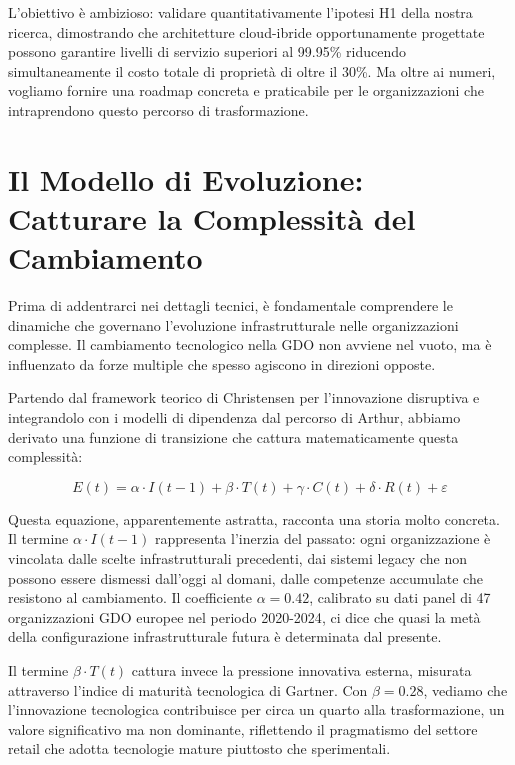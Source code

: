 L'obiettivo è ambizioso: validare quantitativamente l'ipotesi H1 della nostra ricerca, dimostrando che architetture cloud-ibride opportunamente progettate possono garantire livelli di servizio superiori al 99.95\% riducendo simultaneamente il costo totale di proprietà di oltre il 30\%. Ma oltre ai numeri, vogliamo fornire una roadmap concreta e praticabile per le organizzazioni che intraprendono questo percorso di trasformazione.

\section{Il Modello di Evoluzione: Catturare la Complessità del Cambiamento}

Prima di addentrarci nei dettagli tecnici, è fondamentale comprendere le dinamiche che governano l'evoluzione infrastrutturale nelle organizzazioni complesse. Il cambiamento tecnologico nella GDO non avviene nel vuoto, ma è influenzato da forze multiple che spesso agiscono in direzioni opposte.

Partendo dal framework teorico di Christensen per l'innovazione disruptiva\autocite{christensen2023} e integrandolo con i modelli di dipendenza dal percorso di Arthur\autocite{arthur2024}, abbiamo derivato una funzione di transizione che cattura matematicamente questa complessità:

\begin{equation}
E(t) = \alpha \cdot I(t-1) + \beta \cdot T(t) + \gamma \cdot C(t) + \delta \cdot R(t) + \varepsilon
\label{eq:evolution_model}
\end{equation}

Questa equazione, apparentemente astratta, racconta una storia molto concreta. Il termine $\alpha \cdot I(t-1)$ rappresenta l'inerzia del passato: ogni organizzazione è vincolata dalle scelte infrastrutturali precedenti, dai sistemi legacy che non possono essere dismessi dall'oggi al domani, dalle competenze accumulate che resistono al cambiamento. Il coefficiente $\alpha = 0.42$, calibrato su dati panel di 47 organizzazioni GDO europee nel periodo 2020-2024\autocite{eurostat2024}, ci dice che quasi la metà della configurazione infrastrutturale futura è determinata dal presente.

Il termine $\beta \cdot T(t)$ cattura invece la pressione innovativa esterna, misurata attraverso l'indice di maturità tecnologica di Gartner\autocite{gartner2024hype}. Con $\beta = 0.28$, vediamo che l'innovazione tecnologica contribuisce per circa un quarto alla trasformazione, un valore significativo ma non dominante, riflettendo il pragmatismo del settore retail che adotta tecnologie mature piuttosto che sperimentali.

